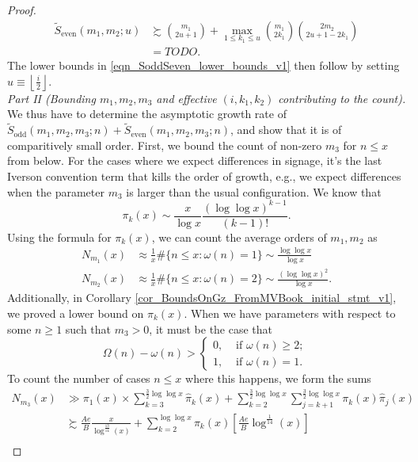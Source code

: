 \documentclass[11pt,reqno,a4letter]{article}
\numberwithin{figure}{section}
\numberwithin{table}{section}
\newcommand{\Floor}[2]{\ensuremath{\left\lfloor \frac{#1}{#2} \right\rfloor}}
\theoremstyle{plain}
\numberwithin{theorem}{section}
\theoremstyle{definition}
\begin{document}
\begin{proof}
\begin{align*}
\widetilde{S}_{\operatorname{even}}(m_1, m_2; u) & \succsim \binom{m_1}{2u+1} + 
     \max_{1 \leq k_1 \leq u} \binom{m_1}{2k_1} \binom{2m_2}{2u+1-2k_1} \\ 
     & = TODO. 
\end{align*} 
The lower bounds in \eqref{eqn_SoddSeven_lower_bounds_v1} then follow by setting 
$u \equiv \Floor{i}{2}$. \\ 
\textit{Part II (Bounding $m_1,m_2,m_3$ and effective $(i, k_1, k_2)$ contributing to the count). } 
We thus have to determine the asymptotic growth rate of 
$\widetilde{S}_{\operatorname{odd}}(m_1, m_2, m_3; n) + \widetilde{S}_{\operatorname{even}}(m_1, m_2, m_3; n)$, 
and show that it is of comparitively small order. First, we bound the count of non-zero $m_3$ for 
$n \leq x$ from below. 
For the cases where we expect differences in 
signage, it's the last Iverson convention term that kills the order of growth, e.g., we expect differences 
when the parameter $m_3$ is larger than the usual configuration. 
We know that 
\[
\pi_k(x) \sim \frac{x}{\log x} \frac{(\log\log x)^{k-1}}{(k-1)!}. 
\]
Using the formula for $\pi_k(x)$, we can count the average orders of $m_1,m_2$ as 
\begin{align*}
N_{m_1}(x) & \approx \frac{1}{x} \#\{n \leq x: \omega(n) = 1\} \sim \frac{\log\log x}{\log x} \\ 
N_{m_2}(x) & \approx \frac{1}{x} \#\{n \leq x: \omega(n) = 2\} \sim \frac{(\log\log x)^2}{\log x}. 
\end{align*} 
Additionally, in Corollary \ref{cor_BoundsOnGz_FromMVBook_initial_stmt_v1}, 
we proved a lower bound on $\widehat{\pi}_k(x)$. 
When we have parameters with respect to some $n \geq 1$ 
such that $m_3 > 0$, it must be the case that 
\[
\Omega(n) - \omega(n) > \begin{cases} 
     0, & \text{ if $\omega(n) \geq 2$; } \\ 
     1, & \text{ if $\omega(n) = 1$. } 
     \end{cases}
\]
To count the number of cases $n \leq x$ where this happens, we form the sums 
\begin{align*} 
N_{m_3}(x) & \gg \pi_1(x) \times \sum_{k=3}^{\frac{3}{2} \log\log x} \widehat{\pi}_k(x) + 
     \sum_{k=2}^{\frac{3}{2} \log\log x} \sum_{j=k+1}^{\frac{3}{2} \log\log x} 
     \pi_k(x) \widehat{\pi}_j(x) \\ 
     & \succsim \frac{Ae}{B} \frac{x}{\log^{\frac{13}{14}}(x)} + 
     \sum_{k=2}^{\log\log x} \pi_k(x) \left[ 
     \frac{Ae}{B} \log^{\frac{1}{14}}(x) 
     \right] \\ 

\end{align*}
\end{proof}
\end{document}
